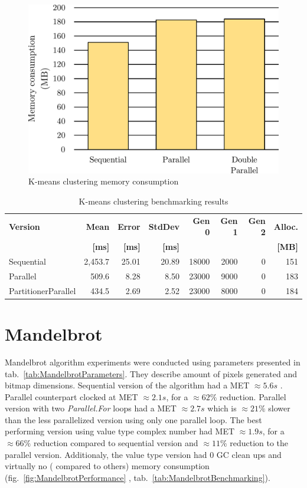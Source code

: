 \begin{figure}[htb]
\centering
\includegraphics[width=.62\linewidth]{figures04/KMeansMemory.pdf}
\caption{K-means clustering memory consumption}
\label{fig:KMeansMemory}
\end{figure}

\begin{table}[ht]\small
    \centering
    \caption{K-means clustering benchmarking results}
		\label{tab:KMeansBenchmarking}
    \begin{tabularx}{\linewidth}{Xrrrrrrr} 
		\toprule
		\toprule
			\bfseries Version 		&
			\bfseries Mean 	      &
			\bfseries Error       &
			\bfseries StdDev 	    &
			\bfseries Gen 0	    	&
			\bfseries Gen 1	    	&
			\bfseries Gen 2	    	&
			\bfseries Alloc.      \\ 
			&
			\bfseries {[}ms{]} &
			\bfseries {[}ms{]} &
			\bfseries {[}ms{]} &
			&
			&
			&
			\bfseries{[}MB{]} \\	
			\midrule 
Sequential & 2,453.7 	& 25.01	& 20.89	& 18000 & 	2000 & 	0 & 151  \\
Parallel & 509.6 	& 8.28 	& 8.50 	& 23000 & 	9000 & 	0 & 183  \\ 
PartitionerParallel & 434.5 	& 2.69 	& 2.52 	& 23000 & 	8000 & 	0 & 184  \\
			\bottomrule
		\end{tabularx}
\end{table}

\section{Mandelbrot}
\label{sec: Mandelbrot}
Mandelbrot algorithm experiments were conducted using parameters presented in 
tab.~\ref{tab:MandelbrotParameters}. They describe amount of pixels 
generated and bitmap dimensions.
Sequential version of the algorithm had a MET  $\approx 5.6s$ . Parallel 
counterpart clocked at MET  $\approx 2.1s$, for a $\approx 62\%$ reduction. 
Parallel version with two \emph{Parallel.For} loops had a MET $\approx 2.7s$ 
which is $\approx 21\%$ slower than the less parallelized version using only 
one parallel loop. The best performing version using value type complex 
number had MET $\approx 1.9s$, for a $\approx 66\%$  reduction compared to 
sequential version and $\approx 11\%$  reduction to the parallel version. 
Additionaly, the value type version had 0 GC clean ups and virtually no (
compared to others) memory consumption (fig.~\ref{fig:MandelbrotPerformance}
, tab.~\ref{tab:MandelbrotBenchmarking}).

